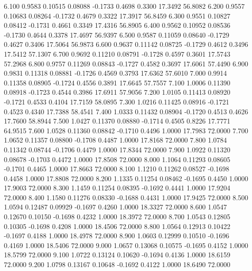    6.100   0.9583   0.10515   0.08088  -0.1733   0.4698   0.3300  17.3492  56.8082
   6.200   0.9557   0.10683   0.08264  -0.1732   0.4679   0.3322  17.3917  56.8459
   6.300   0.9551   0.10827   0.08412  -0.1731   0.4661   0.3349  17.4316  56.8905
   6.400   0.9562   0.10952   0.08536  -0.1730   0.4644   0.3378  17.4697  56.9397
   6.500   0.9587   0.11059   0.08640  -0.1729   0.4627   0.3406  17.5064  56.9873
   6.600   0.9637   0.11142   0.08725  -0.1729   0.4612   0.3496  17.5412  57.1307
   6.700   0.9692   0.11210   0.08791  -0.1728   0.4597   0.3601  17.5743  57.2968
   6.800   0.9757   0.11269   0.08843  -0.1727   0.4582   0.3697  17.6061  57.4490
   6.900   0.9831   0.11318   0.08881  -0.1726   0.4569   0.3793  17.6362  57.6010
   7.000   0.9914   0.11358   0.08905  -0.1724   0.4556   0.3891  17.6645  57.7557
   7.100   1.0006   0.11390   0.08918  -0.1723   0.4544   0.3986  17.6911  57.9056
   7.200   1.0105   0.11413   0.08920  -0.1721   0.4533   0.4104  17.7159  58.0895
   7.300   1.0216   0.11425   0.08916  -0.1721   0.4523   0.4340  17.7388  58.4541
   7.400   1.0333   0.11432   0.08904  -0.1720   0.4513   0.4626  17.7600  58.8944
   7.500   1.0427   0.11370   0.08880  -0.1714   0.4505   0.8226  17.7771  64.9515
   7.600   1.0528   0.11360   0.08842  -0.1710   0.4496   1.0000  17.7983  72.0000
   7.700   1.0652   0.11357   0.08800  -0.1708   0.4487   1.0000  17.8168  72.0000
   7.800   1.0784   0.11342   0.08744  -0.1706   0.4479   1.0000  17.8344  72.0000
   7.900   1.0922   0.11320   0.08678  -0.1703   0.4472   1.0000  17.8508  72.0000
   8.000   1.1064   0.11293   0.08605  -0.1701   0.4465   1.0000  17.8663  72.0000
   8.100   1.1210   0.11262   0.08527  -0.1698   0.4458   1.0000  17.8808  72.0000
   8.200   1.1335   0.11254   0.08462  -0.1695   0.4450   1.0000  17.9003  72.0000
   8.300   1.1459   0.11254   0.08395  -0.1692   0.4441   1.0000  17.9204  72.0000
   8.400   1.1580   0.11276   0.08330  -0.1688   0.4431   1.0000  17.9425  72.0000
   8.500   1.0594   0.12487   0.09929  -0.1697   0.4260   1.0000  18.3327  72.0000
   8.600   1.0547   0.12670   0.10150  -0.1698   0.4232   1.0000  18.3972  72.0000
   8.700   1.0543   0.12805   0.10305  -0.1698   0.4208   1.0000  18.4506  72.0000
   8.800   1.0564   0.12913   0.10422  -0.1697   0.4188   1.0000  18.4978  72.0000
   8.900   1.0603   0.12999   0.10510  -0.1696   0.4169   1.0000  18.5406  72.0000
   9.000   1.0657   0.13068   0.10575  -0.1695   0.4152   1.0000  18.5799  72.0000
   9.100   1.0722   0.13124   0.10620  -0.1694   0.4136   1.0000  18.6159  72.0000
   9.200   1.0798   0.13167   0.10648  -0.1692   0.4122   1.0000  18.6490  72.0000
